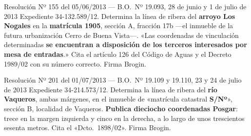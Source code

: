 \begin{ficha}{Resolución Nº 155 del 05/06/2013 --- B.O.\ Nº 19.093, 28 de junio y 1 de julio de 2013}
Expediente 34-132.589/12. Determina la línea de ribera del \textbf{arroyo Los Nogales} en la \textbf{matrícula 1905}, sección A, fracción 17b ---el inmueble de la futura urbanización Cerro de Buena Vista---. «Las coordenadas de vinculación determinadas \textbf{se encuentran a disposición de los terceros interesados por mesa de entradas}.» Cita el artículo 126 del Código de Aguas y el Decreto 1989/02 con su número correcto. Firma Brogin.
\end{ficha}

\begin{ficha}{Resolución Nº 201 del 01/07/2013 --- B.O.\ Nº 19.109 y 19.110, 23 y 24 de julio de 2013}
Expediente 34-214.573/12. Determina la línea de ribera del \textbf{río Vaqueros}, ambas márgenes, en el inmueble de «matrícula catastral \textbf{S/Nº}», sección B, localidad de Vaqueros. \textbf{Publica dieciocho coordenadas Posgar}: trece en la margen izquierda y cinco en la derecha, a lo largo de unos trescientos sesenta metros. Cita el «Dcto.\ 1898/02». Firma Brogin.
\end{ficha}

